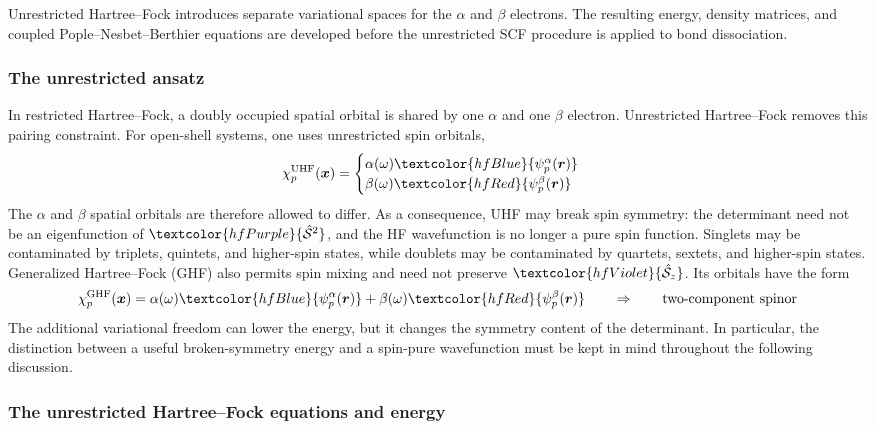 \documentclass[11pt,a4paper,titlepage]{article}
\numberwithin{equation}{section}
\newcommand{\br}{\boldsymbol{r}}
\newcommand{\bx}{\boldsymbol{x}}
\newcommand{\chS}{\Hat{\mathcal{S}}}
\newcommand{\purple}[1]{\textcolor{hfPurple}{#1}}
\newcommand{\red}[1]{\textcolor{hfRed}{#1}}
\newcommand{\blue}[1]{\textcolor{hfBlue}{#1}}
\newcommand{\violet}[1]{\textcolor{hfViolet}{#1}}
\begin{document}
Unrestricted Hartree--Fock introduces separate variational spaces for the
$\alpha$ and $\beta$ electrons. The resulting energy, density matrices, and
coupled Pople--Nesbet--Berthier equations are developed before the unrestricted SCF
procedure is applied to bond dissociation.

\subsubsection{The unrestricted ansatz}

In restricted Hartree--Fock, a doubly occupied spatial orbital is shared by
one $\alpha$ and one $\beta$ electron. Unrestricted Hartree--Fock removes this
pairing constraint. For open-shell systems, one uses unrestricted spin
orbitals,
\begin{equation}
  \chi_p^\text{UHF}(\bx)
  =\begin{cases}
    \alpha(\omega)\blue{\psi_p^\alpha(\br)}\\
    \beta(\omega)\red{\psi_p^\beta(\br)}
  \end{cases}
\end{equation}
The $\alpha$ and $\beta$ spatial orbitals are therefore allowed to differ.
As a consequence, UHF may break spin symmetry: the determinant need not be an
eigenfunction of $\purple{\chS^2}$, and the HF wavefunction is no longer a
pure spin function. Singlets may be contaminated by triplets, quintets, and
higher-spin states, while doublets may be contaminated by quartets, sextets,
and higher-spin states.
Generalized Hartree--Fock (GHF) also permits spin mixing and need not preserve
$\violet{\chS_z}$. Its orbitals have the form
\begin{equation}
  \chi_p^\text{GHF}(\bx)
  =\alpha(\omega)\blue{\psi_p^\alpha(\br)}
  +\beta(\omega)\red{\psi_p^\beta(\br)}
  \qquad\Rightarrow\qquad
  \text{two-component spinor}
\end{equation}
The additional variational freedom can lower the energy, but it changes the
symmetry content of the determinant. In particular, the distinction between a
useful broken-symmetry energy and a spin-pure wavefunction must be kept in mind
throughout the following discussion.

\subsubsection{The unrestricted Hartree--Fock equations and energy}
\end{document}
